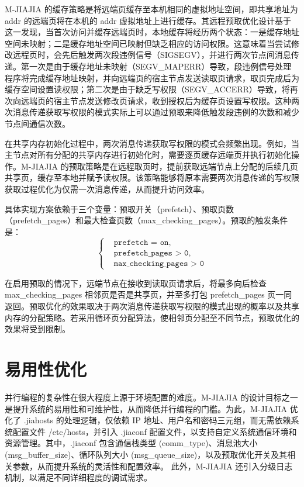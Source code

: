 {    M-JIAJIA 的缓存策略是将远端页缓存至本机相同的虚拟地址空间，即共享地址为 addr 的远端页将在本机的 addr 虚拟地址上进行缓存。其远程预取优化设计基于这一发现，当首次访问并缓存远端页时，本地缓存将经历两个状态：一是缓存地址空间未映射；二是缓存地址空间已映射但缺乏相应的访问权限。这意味着当尝试修改远程页时，会先后触发两次段违例信号（SIGSEGV），并进行两次节点间消息传递。第一次是由于缓存地址未映射（SEGV\_MAPERR）导致，段违例信号处理程序将完成缓存地址映射，并向远端页的宿主节点发送读取页请求，取页完成后为缓存空间设置读权限；第二次是由于缺乏写权限（SEGV\_ACCERR）导致，将再次向远端页的宿主节点发送修改页请求，收到授权后为缓存页设置写权限。这种两次消息传递获取写权限的模式实际上可以通过预取来降低触发段违例的次数和减少节点间通信次数。

    在共享内存初始化过程中，两次消息传递获取写权限的模式会频繁出现。例如，当主节点对所有分配的共享内存进行初始化时，需要逐页缓存远端页并执行初始化操作。M-JIAJIA 的预取策略是在远程取页时，提前获取远端节点上分配的后续几页共享页，缓存至本地并赋予读权限。该策略能够将原本需要两次消息传递的写权限获取过程优化为仅需一次消息传递，从而提升访问效率。

    具体实现方案依赖于三个变量：预取开关（prefetch）、预取页数（prefetch\_pages）和最大检查页数（max\_checking\_pages）。预取的触发条件是：
    $$
        \left\{
        \begin{aligned}
             & \texttt{prefetch = on},           \\
             & \texttt{prefetch\_pages > 0},     \\
             & \texttt{max\_checking\_pages > 0}
        \end{aligned}
        \right.
    $$

    在启用预取的情况下，远端节点在接收到读取页请求后，将最多向后检查 max\_checking\_pages 相邻页是否是共享页，并至多打包 prefetch\_pages 页一同返回。预取优化的效果取决于两次消息传递获取写权限的模式出现的概率以及共享内存的分配策略。若采用循环页分配算法，使相邻页分配至不同节点，预取优化的效果将受到限制。


    \section{易用性优化}
    并行编程的复杂性在很大程度上源于环境配置的难度。M-JIAJIA 的设计目标之一是提升系统的易用性和可维护性，从而降低并行编程的门槛。为此，M-JIAJIA 优化了 .jiahosts 的处理逻辑，仅依赖 IP 地址、用户名和密码三元组，而无需依赖系统配置文件 /etc/hosts，并引入 .jiaconf 配置文件，以支持自定义系统通信环境和资源管理。其中，.jiaconf 包含通信栈类型 (comm\_type)、消息池大小 (msg\_buffer\_size)、循环队列大小 (msg\_queue\_size)，以及预取优化开关及其相关参数，从而提升系统的灵活性和配置效率。
    此外，M-JIAJIA 还引入分级日志机制，以满足不同详细程度的调试需求。

}
